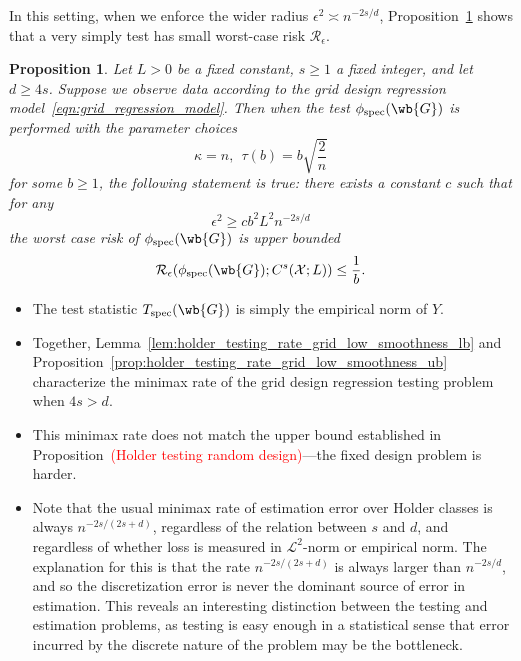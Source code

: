 \documentclass{article}
\newcommand{\1}{\mathbf{1}}
\newcommand{\Xset}{\mathcal{X}}
\newcommand{\Leb}{\mathcal{L}}
\newcommand{\spec}{\mathrm{spec}}
\theoremstyle{alden}
\theoremstyle{aldenthm}
\newtheorem{proposition}{Proposition}
\theoremstyle{definition}
\theoremstyle{remark}
\begin{document}
In this setting, when we enforce the wider radius $\epsilon^2 \asymp n^{-2s/d}$, Proposition~\ref{prop:holder_testing_rate_grid_low_smoothness_ub} shows that a very simply test has small worst-case risk $\mathcal{R}_{\epsilon}$. 

\begin{proposition}
	\label{prop:holder_testing_rate_grid_low_smoothness_ub}
	Let $L > 0$ be a fixed constant, $s \geq 1$ a fixed integer, and let $d \geq 4s$. Suppose we observe data according to the grid design regression model~\eqref{eqn:grid_regression_model}. Then when the test $\phi_{\spec}(\wb{G})$ is performed with the parameter choices
	\begin{equation*}
	\kappa = n,~~ \tau(b) = b\sqrt{\frac{2}{n}}
	\end{equation*}
	for some $b \geq 1$, the following statement is true: there exists a constant $c$ such that for any 
	\begin{equation*}
	\epsilon^2 \geq c b^2 L^2 n^{-2s/d}
	\end{equation*}
	the worst case risk of $\phi_{\spec}(\wb{G})$ is upper bounded
	\begin{equation*}
	\mathcal{R}_{\epsilon}(\phi_{\spec}(\wb{G}); C^s(\Xset;L)) \leq \frac{1}{b}. 
	\end{equation*}
\end{proposition}

\begin{itemize}
	\item The test statistic $T_{\spec}(\wb{G})$ is simply the empirical norm of $Y$. 
	\item Together, Lemma~\ref{lem:holder_testing_rate_grid_low_smoothness_lb} and Proposition~\eqref{prop:holder_testing_rate_grid_low_smoothness_ub} characterize the minimax rate of the grid design regression testing problem when $4s > d$.
	\item This minimax rate does not match the upper bound established in Proposition~\textcolor{red}{(Holder testing random design)}---the fixed design problem is harder. 
	\item Note that the usual minimax rate of estimation error over Holder classes is always $n^{-2s/(2s + d)}$, regardless of the relation between $s$ and $d$, and regardless of whether loss is measured in $\Leb^2$-norm or empirical norm. The explanation for this is that the rate $n^{-2s/(2s + d)}$ is always larger than $n^{-2s/d}$, and so the discretization error is never the dominant source of error in estimation. This reveals an interesting distinction between the testing and estimation problems, as testing is easy enough in a statistical sense that error incurred by the discrete nature of the problem may be the bottleneck.
\end{itemize}
\end{document}
